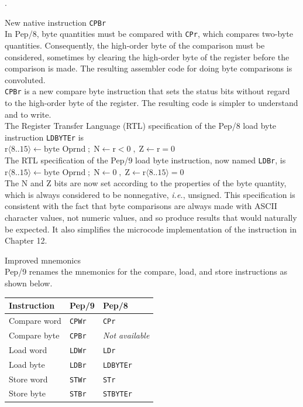\documentclass[10pt,fleqn]{book}
\newenvironment{exercises}
   {\begin{list}
      {\arabic{ecounter}.}
      {
         \usecounter{ecounter}
         \setcounter {ecounter}{0}
         \setlength\leftmargin{2pc}
         \setlength\labelwidth{6pc}
         \setlength\labelsep{1pc}
      }}
   {\end{list}}
\newcounter{ecounter}
\begin{document}
\begin{exercises}
\item New native instruction \verb|CPBr|\\[6pt]
In Pep/8, byte quantities must be compared with \verb|CPr|, which compares two-byte quantities.
Consequently, the high-order byte of the comparison must be considered, sometimes by clearing the high-order byte of the register before the comparison is made.
The resulting assembler code for doing byte comparisons is convoluted.\\[6pt]
\verb|CPBr| is a new compare byte instruction that sets the status bits without regard to the high-order byte of the register.
The resulting code is simpler to understand and to write.\\[6pt]
The Register Transfer Language (RTL) specification of the Pep/8 load byte instruction \verb|LDBYTEr| is\\[6pt]
$\textrm{r}\langle 8..15\rangle \leftarrow \textrm{byte Oprnd} \; ; \; \textrm{N}\leftarrow \textrm{r}<0 \; , \; \textrm{Z}\leftarrow \textrm{r}=0$\\[6pt]
The RTL specification of the Pep/9 load byte instruction, now named \verb|LDBr|, is\\[6pt]
$\textrm{r}\langle 8..15\rangle \leftarrow \textrm{byte Oprnd} \; ; \; \textrm{N}\leftarrow 0 \; , \; \textrm{Z}\leftarrow \textrm{r}\langle 8..15\rangle=0$\\[6pt]
The N and Z bits are now set according to the properties of the byte quantity, which is always considered to be nonnegative, \textit{i.e.}, unsigned.
This specification is consistent with the fact that byte comparisons are always made with ASCII character values, not numeric values, and so produce results that would naturally be expected.
It also simplifies the microcode implementation of the instruction in Chapter 12.

\item Improved mnemonics\\[6pt]
Pep/9 renames the mnemonics for the compare, load, and store instructions as shown below.\\[6pt]
\begin{tabular}{ l l l }
\toprule
Instruction & Pep/9       & Pep/8\\
\midrule
Compare word & \verb|CPWr| & \verb|CPr|\\
Compare byte & \verb|CPBr| & \textit{Not available}\\
Load word    & \verb|LDWr| & \verb|LDr|\\
Load byte    & \verb|LDBr| & \verb|LDBYTEr|\\
Store word   & \verb|STWr| & \verb|STr|\\
Store byte   & \verb|STBr| & \verb|STBYTEr|\\
\bottomrule
\end{tabular}


\end{exercises}
\end{document}
